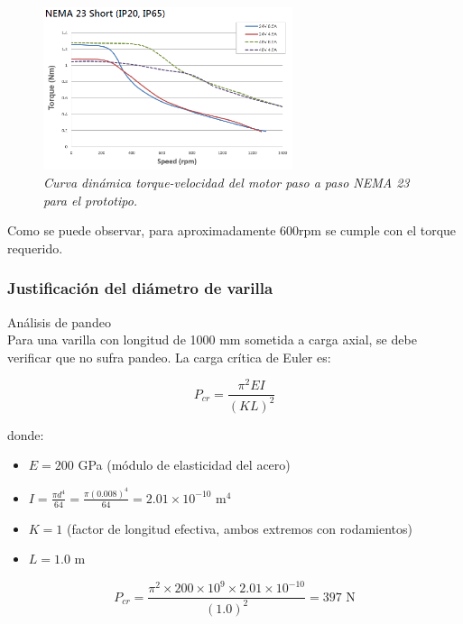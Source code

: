 \begin{figure}[H]
    \centering
    \includegraphics[width=0.65\textwidth]{img/nema23_proto.png}
    \caption{\textit{Curva dinámica torque-velocidad del motor paso a paso NEMA 23 para el prototipo.}}
    \label{fig:Curva_din_nema23_proto}
\end{figure}

Como se puede observar, para aproximadamente 600rpm se cumple con el torque requerido.\\

\subsubsection{Justificación del diámetro de varilla}

Análisis de pandeo\\
\noindent
Para una varilla con longitud de 1000 mm sometida a carga axial, se debe verificar que no sufra pandeo. La carga crítica de Euler es:

\begin{equation}
P_{cr} = \frac{\pi^2 E I}{(K L)^2}
\end{equation}

donde:
\begin{itemize}[label=$\bullet$]
    \item $E = 200$ GPa (módulo de elasticidad del acero)
    \item $I = \frac{\pi d^4}{64} = \frac{\pi (0.008)^4}{64} = 2.01 \times 10^{-10}$ m$^4$
    \item $K = 1$ (factor de longitud efectiva, ambos extremos con rodamientos)
    \item $L = 1.0$ m
\end{itemize}

\begin{equation}
P_{cr} = \frac{\pi^2 \times 200 \times 10^9 \times 2.01 \times 10^{-10}}{(1.0)^2} = 397 \text{ N}
\end{equation}

